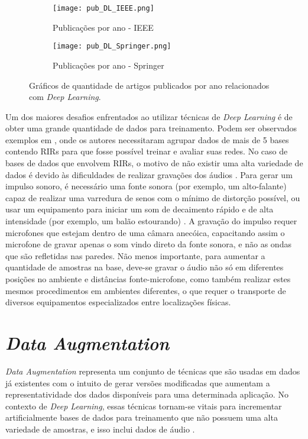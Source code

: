 \begin{figure} [H]
    \begin{subfigure}{1\textwidth}
        \centering
        \texttt{[image: pub\_DL\_IEEE.png]}
        \caption{Publicações por ano - IEEE}    
    \end{subfigure}
    \begin{subfigure}{1\textwidth}
        \centering
        \texttt{[image: pub\_DL\_Springer.png]}
        \caption{Publicações por ano - Springer\textregistered}    
    \end{subfigure}
    \caption{Gráficos de quantidade de artigos publicados por ano relacionados com \textit{Deep Learning}.}
    \label{fig:pub_DL}
\end{figure}

Um dos maiores desafios enfrentados ao utilizar técnicas de \textit{Deep Learning} é de obter uma grande quantidade de dados para treinamento.
Podem ser observados exemplos em \cite{Estimation_RT_DRR,ACE_Data_Aug_Eval}, onde os autores necessitaram agrupar dados de mais de 5 bases contendo
RIRs para que fosse possível treinar e avaliar suas redes.
No caso de bases de dados que envolvem RIRs, o motivo de não existir uma alta variedade de dados é devido às dificuldades
de realizar gravações dos áudios \cite{Recording_RIR_2}.
Para gerar um impulso sonoro, é necessário uma fonte sonora (por exemplo, um alto-falante) capaz de realizar uma varredura de senos com o mínimo de distorção
possível, ou usar um equipamento para iniciar um som de decaimento rápido e de alta intensidade (por exemplo, um balão estourando) \cite{Recording_RIR}.
A gravação do impulso requer microfones que estejam dentro de uma câmara anecóica, capacitando assim o microfone de gravar apenas o som vindo direto
da fonte sonora, e não as ondas que são refletidas nas paredes.
Não menos importante, para aumentar a quantidade de amostras na base, deve-se gravar o áudio não só em diferentes posições no ambiente
e distâncias fonte-microfone, como também realizar estes mesmos procedimentos em ambientes diferentes, o que requer o transporte de diversos equipamentos
especializados entre localizações físicas.

\section{\textit{Data Augmentation}}

\textit{Data Augmentation} representa um conjunto de técnicas que são usadas em dados já existentes com o intuito de gerar versões
modificadas que aumentam a representatividade dos dados disponíveis para uma determinada aplicação. 
No contexto de \textit{Deep Learning}, essas técnicas tornam-se vitais para incrementar artificialmente bases de dados
para treinamento que não possuem uma alta variedade de amostras, e isso inclui dados de áudio \cite{DL_Data_Aug_sc,Metric_Data_Aug_sc}.

